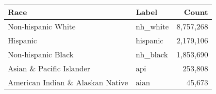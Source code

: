 \begin{tabular}{llr}
    \toprule
    Race                              & Label     & Count     \\
    \midrule
    Non-hispanic White                & nh\_white & 8,757,268 \\
    Hispanic                          & hispanic  & 2,179,106 \\
    Non-hispanic Black                & nh\_black & 1,853,690 \\
    Asian \& Pacific Islander         & api       & 253,808   \\
    American Indian \& Alaskan Native & aian      & 45,673    \\
    \bottomrule
\end{tabular}
